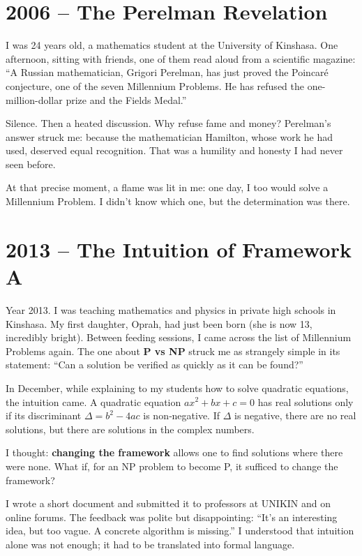 \documentclass[11pt,a4paper]{article}
\begin{document}
\section{2006 – The Perelman Revelation}

I was 24 years old, a mathematics student at the University of Kinshasa. One afternoon, sitting with friends, one of them read aloud from a scientific magazine: ``A Russian mathematician, Grigori Perelman, has just proved the Poincaré conjecture, one of the seven Millennium Problems. He has refused the one-million-dollar prize and the Fields Medal.''

Silence. Then a heated discussion. Why refuse fame and money? Perelman's answer struck me: because the mathematician Hamilton, whose work he had used, deserved equal recognition. That was a humility and honesty I had never seen before.

At that precise moment, a flame was lit in me: one day, I too would solve a Millennium Problem. I didn't know which one, but the determination was there.

\section{2013 – The Intuition of Framework A}

Year 2013. I was teaching mathematics and physics in private high schools in Kinshasa. My first daughter, Oprah, had just been born (she is now 13, incredibly bright). Between feeding sessions, I came across the list of Millennium Problems again. The one about \textbf{P vs NP} struck me as strangely simple in its statement: ``Can a solution be verified as quickly as it can be found?''

In December, while explaining to my students how to solve quadratic equations, the intuition came. A quadratic equation $ax^2+bx+c=0$ has real solutions only if its discriminant $\Delta = b^2-4ac$ is non‑negative. If $\Delta$ is negative, there are no real solutions, but there are solutions in the complex numbers.

I thought: \textbf{changing the framework} allows one to find solutions where there were none. What if, for an NP problem to become P, it sufficed to change the framework?

I wrote a short document and submitted it to professors at UNIKIN and on online forums. The feedback was polite but disappointing: ``It's an interesting idea, but too vague. A concrete algorithm is missing.'' I understood that intuition alone was not enough; it had to be translated into formal language.
\end{document}
